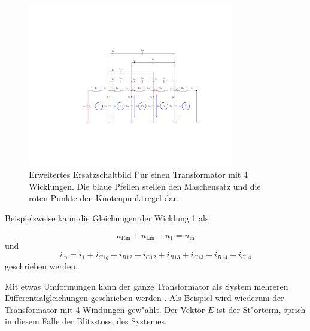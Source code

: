 \begin{refsection}
\begin{figure}
	\centering
	\includegraphics[width=0.8\textwidth]{trafo/orig_trafo.pdf}
	\caption[Erweitertes Ersatzschaltbild f"ur einen Transformator mit Maschensatz und Knotenpunkt]{Erweitertes Ersatzschaltbild f"ur einen Transformator mit 4 Wicklungen. Die blaue Pfeilen stellen den Maschensatz und die roten Punkte den Knotenpunktregel dar.}
	\label{trafo:orig}
\end{figure}

Beispielsweise kann die Gleichungen der Wicklung 1 als 

\begin{equation*}
	u_\mathrm{Rin} + u_\mathrm{Lin} + u_1 = u_\mathrm{in}
\end{equation*}
und 
\begin{equation}
	i_\mathrm{in} = i_1 + i_{C1g} + i_{R12} + i_{C12} + i_{R13} + i_{C13} + i_{R14} + i_{C14}
\end{equation}
geschrieben werden. 

Mit etwas Umformungen kann der ganze Transformator als System mehreren Differentialgleichungen geschrieben werden \cite{trafo:SeminarCHR}. Als Beispiel wird wiederum der Transformator mit 4 Windungen gew"ahlt. Der Vektor $E$ ist der St"orterm, sprich in diesem Falle der Blitzstoss, des Systemes.


\end{refsection}
